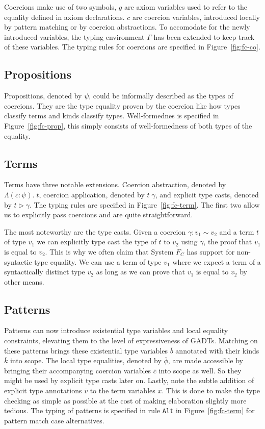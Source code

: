 Coercions make use of two symbols, $g$ are axiom variables used to refer to the
equality defined in axiom declarations. $c$ are coercion variables, introduced
locally by pattern matching or by coercion abstractions. To accomodate for the
newly introduced variables, the typing environment $\Gamma$ has been extended to
keep track of these variables. The typing rules for coercions are specified in
Figure~\ref{fig:fc-co}.

\subsection{Propositions}

Propositions, denoted by $\psi$, could be informally described as the types of
coercions. They are the type equality proven by the coercion like how types
classify terms and kinds classify types. Well-formednes is specified in
Figure~\ref{fig:fc-prop}, this simply consists of well-formedness of both types
of the equality.

\subsection{Terms}

Terms have three notable extensions. Coercion abstraction, denoted by $\Lambda(c
: \psi). \; t$, coercion application, denoted by $t \; \gamma$, and explicit
type casts, denoted by $t \triangleright \gamma$. The typing rules are specified
in Figure~\ref{fig:fc-term}. The first two allow us to explicitly pass coercions
and are quite straightforward.

The most noteworthy are the type casts. Given a coercion $\gamma : v_1 \sim v_2$
and a term $t$ of type $v_1$ we can explicitly type cast the type of $t$ to
$v_2$ using $\gamma$, the proof that $v_1$ is equal to $v_2$.  This is why we
often claim that System $F_C$ has support for non-syntactic type equality. We
can use a term of type $v_1$ where we expect a term of a syntactically distinct
type $v_2$ as long as we can prove that $v_1$ is equal to $v_2$ by other means.

\subsection{Patterns}

Patterns can now introduce existential type variables and local equality
constraints, elevating them to the level of expressiveness of GADTs. Matching on
these patterns brings these existential type variables $\overline{b}$ annotated
with their kinds $\overline{k}$ into scope. The local type equalities, denoted
by $\overline{\phi}$, are made accessible by bringing their accompanying
coercion variables $\overline{c}$ into scope as well. So they might be used by
explicit type casts later on. Lastly, note the subtle addition of explicit type
annotations $\overline{v}$ to the term variables $\overline{x}$. This is done to
make the type checking as simple as possible at the cost of making elaboration
slightly more tedious. The typing of patterns is specified in rule \texttt{Alt}
in Figure~\ref{fig:fc-term} for pattern match case alternatives.


